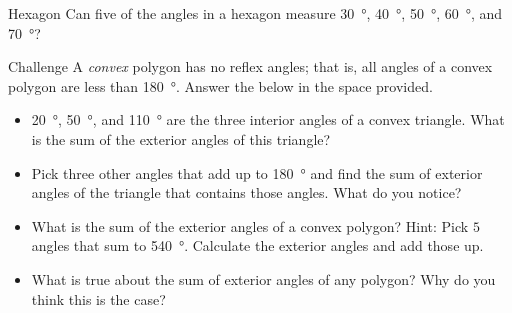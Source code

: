 \documentclass[14pt,letterpaper]{article}
\begin{document}
\begin{problem}{Hexagon}
 Can five of the angles in a hexagon measure \SI{30}{\degree}, \SI{40}{\degree},
 \SI{50}{\degree}, \SI{60}{\degree}, and \SI{70}{\degree}?
\end{problem}

\begin{problem}{Challenge}
 A \emph{convex} polygon has no reflex angles; that is, all angles of a convex
 polygon are less than \SI{180}{\degree}. Answer the below in the space
 provided.

 \begin{itemize}
  \item \SI{20}{\degree}, \SI{50}{\degree}, and \SI{110}{\degree} are the three
  interior angles of a convex triangle. What is the sum of the exterior angles
  of this triangle?
  \item Pick three other angles that add up to \SI{180}{\degree} and find the
  sum of exterior angles of the triangle that contains those angles. What do you
  notice?
  \item What is the sum of the exterior angles of a convex polygon? Hint: Pick
  $5$ angles that sum to \SI{540}{\degree}. Calculate the exterior angles and
  add those up.
  \item What is true about the sum of exterior angles of any polygon? Why do you
  think this is the case?
 \end{itemize}

\end{problem}
\end{document}
